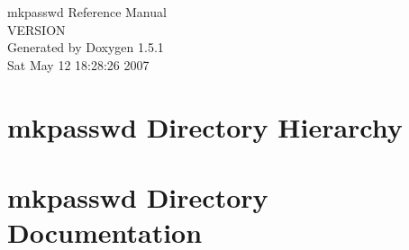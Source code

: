\documentclass[a4paper]{book}
\begin{document}
\begin{titlepage}
\vspace*{7cm}
\begin{center}
{\Large mkpasswd Reference Manual\\[1ex]\large VERSION }\\
\vspace*{1cm}
{\large Generated by Doxygen 1.5.1}\\
\vspace*{0.5cm}
{\small Sat May 12 18:28:26 2007}\\
\end{center}
\end{titlepage}
\clearemptydoublepage
{}
\tableofcontents
\clearemptydoublepage
{}
\chapter{mkpasswd Directory Hierarchy}

\chapter{mkpasswd Directory Documentation}

\printindex
\end{document}
